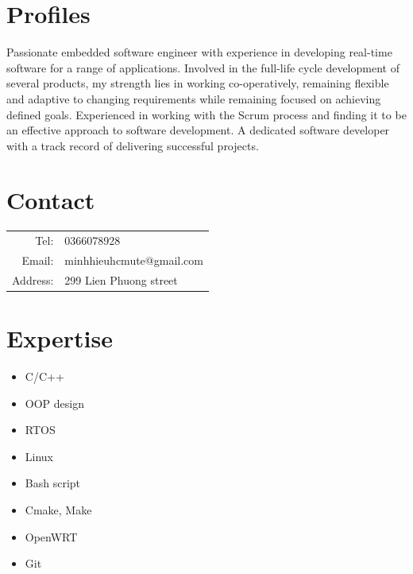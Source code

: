 \documentclass[11pt,oneside,a4paper]{article}
\begin{document}
\begin{tcolorbox}
    \begin{minipage}[t]{8cm}
        \vspace*{-0.5cm}
        \begin{tcolorbox}[grow to left by=0.6cm, colback=gray!25,colframe=white]
            \section*{Profiles}
            Passionate embedded software engineer with experience in developing real-time software for a
            range of applications. Involved in the full-life cycle development of several products, my strength
            lies in working co-operatively, remaining flexible and adaptive to changing requirements while remaining
            focused on achieving defined goals. Experienced in working with the Scrum process and finding it to 
            be an effective approach to software development. A dedicated software developer with a track record of
            delivering successful projects.
            
            \section*{Contact}
            \begin{tabular}{r l}
                Tel: & 0366078928 \\
                Email: & minhhieuhcmute@gmail.com \\
                Address: & 299 Lien Phuong street
            \end{tabular}
            
            \section*{Expertise}
            \begin{itemize}
                \item {C/C++}
                \item {OOP design}
                \item {RTOS}
                \item {Linux}
                \item {Bash script}
                \item {Cmake, Make}
                \item {OpenWRT}
                \item {Git}
            \end{itemize}
            

\end{tcolorbox}
\end{minipage}
\end{tcolorbox}
\end{document}

